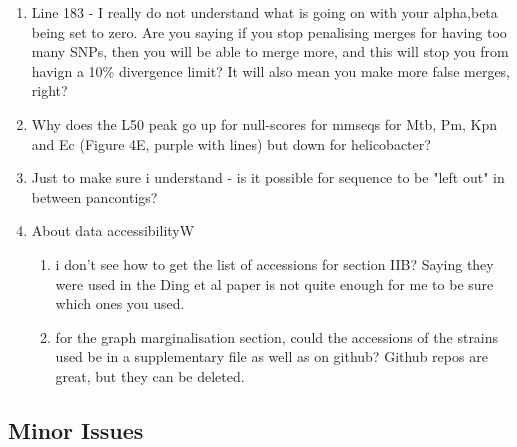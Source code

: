 \documentclass{article}
\begin{document}
\begin{enumerate}
    \item Line 183 - I really do not understand what is going on with your alpha,beta being set to zero. Are you saying if you stop penalising merges for having too many SNPs, then you will be able to merge more, and this will stop you from havign a 10\% divergence limit? It will also mean you make more false merges, right?

    \item Why does the L50 peak go up for null-scores for mmseqs for Mtb, Pm, Kpn and Ec (Figure 4E, purple with lines) but down for helicobacter?

    \item Just to make sure i understand - is it possible for sequence to be "left out" in between pancontigs?

    \item About data accessibilityW
          \begin{enumerate}
              \item i don't see how to get the list of accessions for section IIB? Saying they were used in the Ding et al paper is not quite enough for me to be sure which ones you used.
              \item for the graph marginalisation section, could the accessions of the strains used be in a supplementary file as well as on github? Github repos are great, but they can be deleted.
          \end{enumerate}
\end{enumerate}

\subsection*{Minor Issues}
\end{document}
